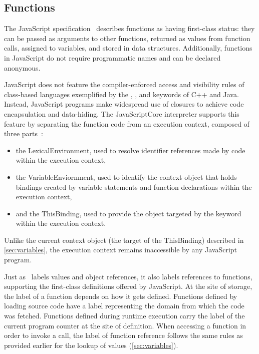 \subsection{Functions}

The JavaScript specification~\cite{ecma} describes functions as having first-class status: they can be passed as arguments to other functions, returned as values from function calls, assigned to variables, and stored in data structures.
Additionally, functions in JavaScript do not require programmatic names and can be declared anonymous.

JavaScript does not feature the compiler-enforced access and visibility rules of class-based languages exemplified by the , , and  keywords of C++ and Java.
Instead, JavaScript programs make widespread use of closures to achieve code encapsulation and data-hiding.
The JavaScriptCore interpreter supports this feature by separating the function code from an execution context, composed of three parts~\cite{ecma}:
\begin{itemize}
  \item the LexicalEnvironment, used to resolve identifier references made by code within the execution context,
  \item the VariableEnviornment, used to identify the context object that holds bindings created by variable statements and function declarations within the execution context,
  \item and the ThisBinding, used to provide the object targeted by the  keyword within the execution context.
\end{itemize}
Unlike the current context object (the target of the ThisBinding) described in \autoref{sec:variables}, the execution context remains inaccessible by any JavaScript program.

Just as \FlowCore\ labels values and object references, it also labels references to functions, supporting the first-class definitions offered by JavaScript.
At the site of storage, the label of a function depends on how it gets defined.
Functions defined by loading source code have a label representing the domain from which the code was fetched.
Functions defined during runtime execution carry the label of the current program counter at the site of definition.
When accessing a function in order to invoke a call, the label of function reference follows the same rules as provided earlier for the lookup of values (\autoref{sec:variables}).

